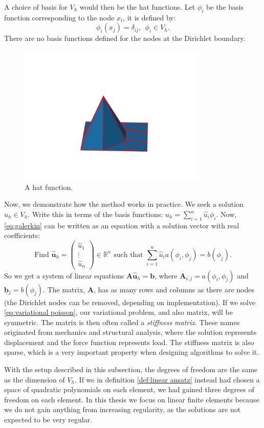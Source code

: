 \documentclass[../Main/main.tex]{subfiles}
\begin{document}
	A choice of basis for $V_h$ would then be the hat functions.  Let $\phi_i$ be the basis function corresponding to the node $x_i$, it is defined by:
	\begin{equation*}
		\phi_i(x_j) = \delta_{ij}, \ \ \phi_i \in V_h.
	\end{equation*}
	There are no basis functions defined for the nodes at the Dirichlet boundary.
	\begin{figure}[H]
		\centering
		\includegraphics[width=0.8\textwidth]{hat_function_python_plot_2.pdf}
		\caption{A hat function.}
		\label{fig:hat1}
	\end{figure}
	Now, we demonstrate how the method works in practice. We seek a solution $u_h \in V_h$. Write this in terms of the basis functions: $u_h = \sum_{i=1}^n \hat{u}_i \phi_i$. Now, \eqref{eq:galerkin} can be written as an equation with a solution vector with real coefficients:
	\begin{equation}\label{eq:fem system}
			\text{Find }\hat{\bm{u}}_h=\begin{pmatrix}
				\hat{u}_1\\ 
				\vdots \\ 
				\hat{u}_n
			\end{pmatrix}\in \mathbb{R}^n \text{ such that }\sum_{i=1}^n \hat{u}_i  a(\phi_i,\phi_j) = b(\phi_j).
	\end{equation}
	So we get a system of linear equations $\bm{A}\hat{\bm{u}}_h = \bm{b}$, where $\bm{A}_{i,j}=a(\phi_i,\phi_j)$ and $\bm{b}_j = b(\phi_j)$. The matrix, $\bm{A}$, has as many rows and columns as there are nodes (the Dirichlet nodes can be removed, depending on implementation). If we solve \eqref{eq:variational poisson}, our variational problem, and also matrix, will be symmetric. The matrix is then often called a \emph{stiffness matrix}. These names originated from mechanics and structural analysis, where the solution represents displacement and the force function represents load. The stiffness matrix is also sparse, which is a very important property when designing algorithms to solve it.\par
	With the setup described in this subsection, the degrees of freedom are the same as the dimension of $V_h$. If we in definition \ref{def:linear ansatz} instead had chosen a space of quadratic polynomials on each element, we had gained three degrees of freedom on each element. In this thesis we focus on linear finite elements because we do not gain anything from increasing regularity, as the solutions are not expected to be very regular. 
\end{document}
